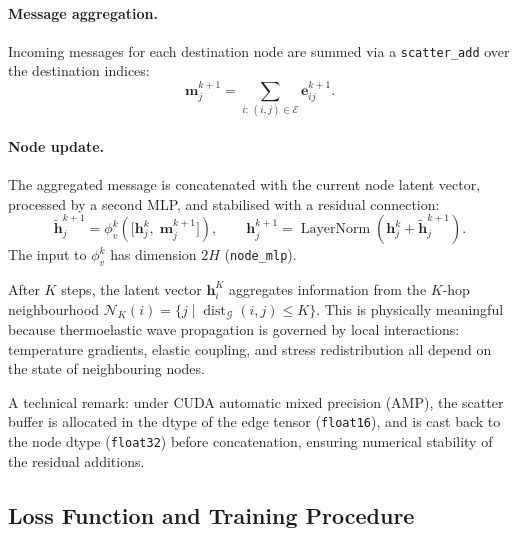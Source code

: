\paragraph{Message aggregation.}
Incoming messages for each destination node are summed via a
\texttt{scatter\_add} over the destination indices:
\[
  \mathbf{m}_j^{k+1}
  = \sum_{i:\,(i,j)\in\mathcal{E}} \mathbf{e}_{ij}^{k+1}.
\]

\paragraph{Node update.}
The aggregated message is concatenated with the current node latent vector,
processed by a second MLP, and stabilised with a residual connection:
\[
  \tilde{\mathbf{h}}_j^{k+1}
  = \phi_v^k\!\left(
      \bigl[\mathbf{h}_j^k,\;\mathbf{m}_j^{k+1}\bigr]
    \right),
  \qquad
  \mathbf{h}_j^{k+1}
  = \operatorname{LayerNorm}\!\left(
      \mathbf{h}_j^k + \tilde{\mathbf{h}}_j^{k+1}
    \right).
\]
The input to \(\phi_v^k\) has dimension \(2H\) (\texttt{node\_mlp}).

After \(K\) steps, the latent vector \(\mathbf{h}_i^K\) aggregates
information from the \(K\)-hop neighbourhood
\(\mathcal{N}_K(i)=\{j\mid\operatorname{dist}_{\mathcal{G}}(i,j)\le K\}\).
This is physically meaningful because thermoelastic wave propagation is governed
by local interactions: temperature gradients, elastic coupling, and stress
redistribution all depend on the state of neighbouring nodes.

A technical remark: under CUDA automatic mixed precision (AMP), the
scatter buffer is allocated in the dtype of the edge tensor (\texttt{float16}),
and is cast back to the node dtype (\texttt{float32}) before concatenation,
ensuring numerical stability of the residual additions.

\subsection{Loss Function and Training Procedure}

